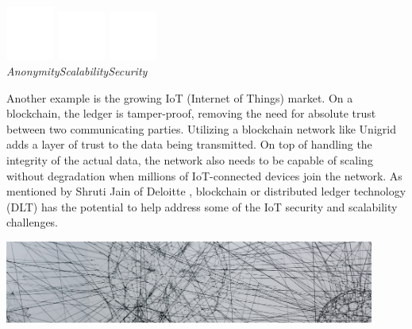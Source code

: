 \documentclass{article}
\begin{document}
\begin{center}
\includegraphics[width=45pt]{anonymous}
\hspace{1.5cm}
\includegraphics[width=45pt]{scalability}
\hspace{1.5cm}
\includegraphics[width=45pt]{security}
\\
\vspace{0.11cm}
\hspace{0pt}\emph{Anonymity}\hspace{49pt}\emph{Scalability}\hspace{58pt}\emph{Security}\hspace{25pt}
\end{center}

\noindent Another example is the growing IoT (Internet of Things) market. On a blockchain, the ledger is tamper-proof, removing the need for absolute trust between two communicating parties. Utilizing a blockchain network like Unigrid adds a layer of trust to the data being transmitted. On top of handling the integrity of the actual data, the network also needs to be capable of scaling without degradation when millions of IoT-connected devices join the network. As mentioned by Shruti Jain of Deloitte \cite{jain2021}, blockchain or distributed ledger technology (DLT) has the potential to help address some of the IoT security and scalability challenges.

\begin{mdframed}[style=textimage]
	\includegraphics[width=345pt]{communication} 
\end{mdframed}
\end{document}
